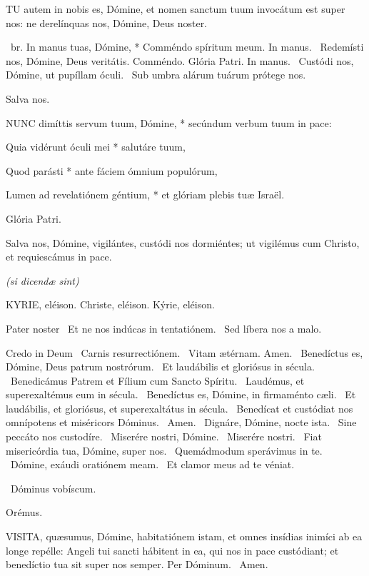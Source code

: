 \lettrine[lines=2]{T}{U} autem in nobis es, Dómine, et nomen sanctum tuum invocátum est super nos: ne derelínquas nos, Dómine, Deus noster.

\R\ br. In manus tuas, Dómine, * Comméndo spíritum meum. In manus. \V\ Redemísti nos, Dómine, Deus veritátis. Comméndo. Glória Patri. In manus. \V\ Custódi nos, Dómine, ut pupíllam óculi. \R\ Sub umbra alárum tuárum prótege nos.

 Salva nos.


\lettrine[lines=2]{N}{UNC} dimíttis servum tuum, Dómine, * secúndum verbum tuum in pace:

Quia vidérunt óculi mei * salutáre tuum,

Quod parásti * ante fáciem ómnium populórum,

Lumen ad revelatiónem géntium, * et glóriam plebis tuæ Israël.

Glória Patri.

 Salva nos, Dómine, vigilántes, custódi nos dormiéntes; ut vigilémus cum Christo, et requiescámus in pace.


\textit{(si dicendæ sint)}

KYRIE, eléison. Christe, eléison. Kýrie, eléison.

Pater noster  \V\ Et ne nos indúcas in tentatiónem. \R\ Sed líbera nos a malo.

Credo in Deum  \V\ Carnis resurrectiónem. \R\ Vitam ætérnam. Amen. \V\ Benedíctus es, Dómine, Deus patrum nostrórum. \R\ Et laudábilis et gloriósus in sécula. \V\ Benedicámus Patrem et Fílium cum Sancto Spíritu. \R\ Laudémus, et superexaltémus eum in sécula. \V\ Benedíctus es, Dómine, in firmaménto cæli. \R\ Et laudábilis, et gloriósus, et superexaltátus in sécula. \V\ Benedícat et custódiat nos omnípotens et miséricors Dóminus. \R\ Amen. \V\ Dignáre, Dómine, nocte ista. \R\ Sine peccáto nos custodíre. \V\ Miserére nostri, Dómine. \R\ Miserére nostri. \V\ Fiat misericórdia tua, Dómine, super nos. \R\ Quemádmodum sperávimus in te. \V\ Dómine, exáudi oratiónem meam. \R\ Et clamor meus ad te véniat.

\sectionornament

\V\ Dóminus vobíscum.

Orémus. 

\lettrine[lines=2]{V}{ISITA}, quæsumus, Dómine, habitatiónem istam, et omnes insídias inimíci ab ea longe repélle: Angeli tui sancti hábitent in ea, qui nos in pace custódiant; et benedíctio tua sit super nos semper. Per Dóminum. \R\ Amen.

